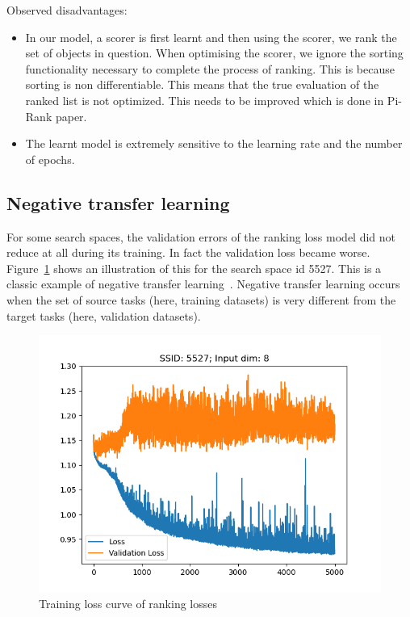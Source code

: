 \documentclass[11pt]{report}
\begin{document}
Observed disadvantages:
\begin{itemize}
\item In our model,  a scorer is first learnt and then using the scorer,  we rank the set of objects in question.
When optimising the scorer,  we ignore the sorting functionality necessary to complete the process of ranking.
This is because sorting is non differentiable. 
This means that the true evaluation of the ranked list is not optimized.
This needs to be improved which is done in Pi-Rank paper.
\item The learnt model is extremely sensitive to the learning rate and the number of epochs.
\end{itemize}
    
\subsection{Negative transfer learning}
For some search spaces,  the validation errors of the ranking loss model did not reduce at all during its training.
In fact the validation loss became worse.
Figure~\ref{fig:NegativeLearning} shows an illustration of this for the search space id 5527.
This is a classic example of negative transfer learning~\cite{Weiss2016}.
Negative transfer learning occurs when the set of source tasks (here,  training datasets) is very different from the target tasks (here, validation datasets).

\begin{figure}[htb]
  \centering
    \includegraphics[scale=0.5]{images/NegativeLearning}
    \caption{Training loss curve of ranking losses}
    \label{fig:NegativeLearning}
\end{figure}
\end{document}
